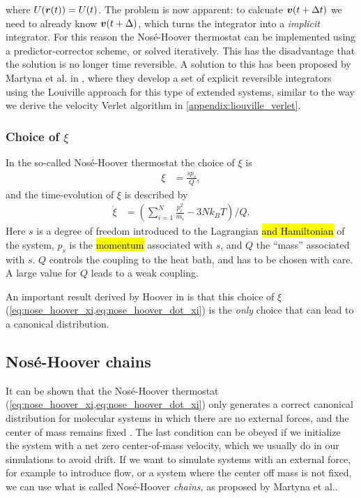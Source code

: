 where $U(\boldsymbol{r}(t)) = U(t)$. The problem is now apparent: to calcuate $\boldsymbol{v}(t+\Delta t)$ we need to already know $\boldsymbol{v}(t+\Delta)$, which turns the integrator into a \emph{implicit} integrator. For this reason the Nosé-Hoover thermostat can be implemented using a predictor-corrector scheme, or solved iteratively\cite[Appendix E.2]{frenkel2001understanding}. This has the disadvantage that the solution is no longer time reversible. A solution to this has been proposed by Martyna et al. in \cite{martyna1996explicit}, where they develop a set of explicit reversible integrators using the Louiville approach for this type of extended systems, similar to the way we derive the velocity Verlet algorithm in \cref{appendix:liouville_verlet}.

\subsubsection{Choice of $\xi$}
In the so-called Nosé-Hoover thermostat the choice of $\xi$ is
\begin{align}
    \xi             &= \frac{sp_s}{Q},\label{eq:nose_hoover_xi}
\end{align}
and the time-evolution of $\xi$ is described by
\begin{align}
    \dot\xi         &= \left( \sum_{i=1}^N \frac{p_i^2}{m_i} - 3Nk_BT \right) / Q.\label{eq:nose_hoover_dot_xi}
\end{align}
Here $s$ is a degree of freedom introduced to the Lagrangian \hl{and Hamiltonian} of the system, $p_s$ is the \hl{momentum} associated with $s$, and $Q$ the ``mass'' associated with $s$. $Q$ controls the coupling to the heat bath, and has to be chosen with care. A large value for $Q$ leads to a weak coupling.

An important result derived by Hoover in \cite{hoover1986constant} is that this choice of $\xi$ (\cref{eq:nose_hoover_xi,eq:nose_hoover_dot_xi}) is the \emph{only} choice that can lead to a canonical distribution.



\subsection{Nosé-Hoover chains\label{sec:nose_hoover_chain}}
It can be shown that the Nosé-Hoover thermostat (\cref{eq:nose_hoover_xi,eq:nose_hoover_dot_xi}) only generates a correct canonical distribution for molecular systems in which there are no external forces, and the center of mass remains fixed \cite[Appendix B.2.1]{frenkel2001understanding}\cite{hoover1985canonical}. The last condition can be obeyed if we initialize the system with a net zero center-of-mass velocity, which we usually do in our simulations to avoid drift. If we want to simulate systems with an external force, for example to introduce flow, or a system where the center off mass is not fixed, we can use what is called Nosé-Hoover \emph{chains}, as proposed by Martyna et al.\cite{martyna1992nose}. 

